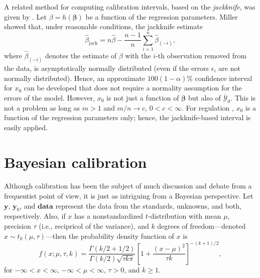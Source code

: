 \documentclass[cmfont,usenames,dvipsnames,leqno]{afit-etd}\usepackage[]{graphicx}\usepackage[]{color}
\newcommand{\mc}[1]{\ensuremath{\mathcal{#1}}}
\newcommand{\wh}[1]{\ensuremath{\widehat{#1}}}
\newcommand{\wb}[1]{\ensuremath{\overline{#1}}}
\begin{document}
A related method for computing calibration intervals, based on the \textit{jackknife}, was given by \citet{miller_unbalanced_1974}. Let $\beta = h(\bm{\beta})$ be a function of the regression parameters. Miller showed that, under reasonable conditions, the jackknife estimate
\begin{equation*}
  \wh{\beta}_\text{jack} = n\wh{\beta} - \frac{n-1}{n}\sum_{i=1}^n\wh{\beta}_{(-i)},
\end{equation*}
where $\wh{\beta}_{(-i)}$ denotes the estimate of $\beta$ with the $i$-th observation removed from the data, is asymptotically normally distributed (even if the errors $\epsilon_i$ are not normally distributed). Hence, an approximate $100(1-\alpha)\%$ confidence interval for $x_0$ can be developed that does not require a normality assumption for the errors of the model. However, $x_0$ is not just a function of $\bm{\beta}$ but also of $\wb{\mc{Y}}_0$. This is not a problem as long as $m > 1$ and $m/n \rightarrow c$, $0 < c < \infty$. For regulation \citep[pp. 431-432]{graybill_regression_1994}, $x_0$ is a function of the regression parameters only; hence, the jackknife-based interval is easily applied.

\section{Bayesian calibration}
\label{sec:bayesian}
Although calibration has been the subject of much discussion and debate from a frequentist point of view, it is just as intriguing from a Bayesian perspective. Let $\bm{y}$, $\bm{y}_0$, and $\mathbf{data}$ represent the data from the standards, unknowns, and both, respectively. Also, if $x$ has a nonstandardized $t$-distribution with mean $\mu$, precision $\tau$ (i.e., recipricol of the variance), and $k$ degrees of freedom---denoted $x \sim t_k(\mu, \tau)$---then the probability density function of $x$ is
\begin{equation*}
  f(x;\mu, \tau, k) = \frac{\Gamma{(k/2+1/2)}}{\Gamma{(k/2)}\sqrt{\tau k \pi}}\left[ 1 + \frac{(x-\mu)^2}{\tau k} \right]^{-(k+1)/2},
\end{equation*}
for $-\infty < x < \infty$, $-\infty < \mu < \infty$, $\tau > 0$, and $k \ge 1$.
\end{document}
